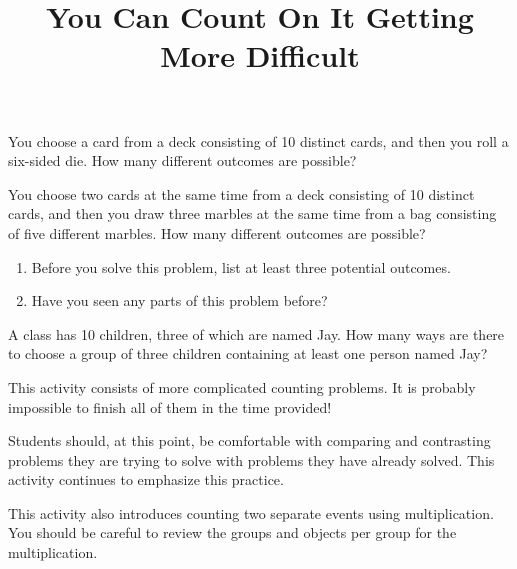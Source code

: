 \documentclass[nooutcomes,noauthor, handout]{ximera}
\title{You Can Count On It Getting More Difficult}
\begin{document}
\begin{abstract}
\end{abstract}
\maketitle





\begin{problem}
You choose a card from a deck consisting of 10 distinct cards, and then you roll a six-sided die.  How many different outcomes are possible?
\end{problem}

\begin{problem}
You choose two cards at the same time from a deck consisting of 10 distinct cards, and then you draw three marbles at the same time from a bag consisting of five different marbles.  How many different outcomes are possible?
\begin{enumerate}
\item Before you solve this problem, list at least three potential outcomes.
\item Have you seen any parts of this problem before?
\end{enumerate}
\end{problem}

\begin{problem}
A class has 10 children, three of which are named Jay.  How many ways are there to choose a group of three children containing at least one person named Jay?
\end{problem}


\newpage

\begin{instructorNotes}
This activity consists of more complicated counting problems.  It is probably impossible to finish all of them in the time provided!

Students should, at this point, be comfortable with comparing and contrasting problems they are trying to solve with problems they have already solved.  This activity continues to emphasize this practice.

This activity also introduces counting two separate events using multiplication.  You should be careful to review the groups and objects per group for the multiplication.
\end{instructorNotes}
\end{document}
